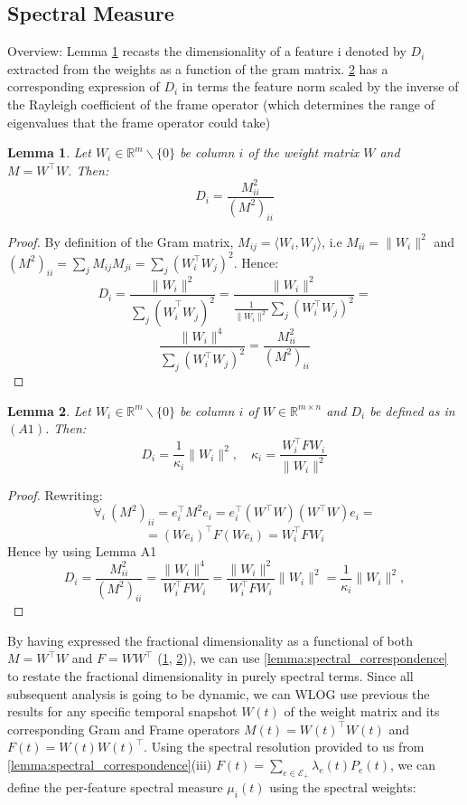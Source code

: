 \documentclass{article}
\theoremstyle{plain}
\newtheorem{lemma}{Lemma}[section]
\numberwithin{equation}{section}
\theoremstyle{definition}
\theoremstyle{remark}
\begin{document}
\subsection{Spectral Measure}
Overview: Lemma \ref{lemma:dimensionality_gram} recasts the dimensionality of a feature i denoted by $D_i$ extracted from the weights as a function of the gram matrix. \ref{lemma:dimensionality_kappa} has a corresponding expression of $D_i$ in terms the feature norm scaled by the inverse of the Rayleigh coefficient of the frame operator (which determines the range of eigenvalues that the frame operator could take) 
\begin{lemmaproofbox} 
\begin{lemma} \label{lemma:dimensionality_gram}
Let $W_i\in \mathbb{R}^m\backslash\{0\}$ be column $i$ of the weight matrix $W$ and $M = W^\top W$. 
Then: \begin{equation*}D_i = \frac{M_{ii}^2}{(M^2)_{ii}}\tag{A1}\end{equation*}
\end{lemma}
\begin{proof} By definition of the Gram matrix, $M_{ij} = \langle W_i, W_j\rangle$, i.e $M_{ii} = \|W_i\|^2$ and $(M^2)_{ii} = \sum_j M_{ij}M_{ji} = \sum_j (W_i^\top W_j)^2$. Hence: 
$$D_i = \frac{\|W_i\|^2}{\sum_j (\hat{W}_i^\top W_j)^2} =\frac{\|W_i\|^2}{\frac{1}{\|W_i\|^2}\sum_j (W_i^\top W_j)^2 }=$$
$$\frac{\|W_i\|^4}{\sum_j (W_i^\top W_j)^2 } = \frac{M_{ii}^2}{(M^2)_{ii}} $$
\end{proof}
\end{lemmaproofbox}

\begin{lemmaproofbox} 
    \begin{lemma} \label{lemma:dimensionality_kappa} Let $W_i\in \mathbb{R}^m\backslash \{0\}$ be column $i$ of $W\in \mathbb{R}^{m\times n}$ and $D_i$ be defined as in $(A1)$. Then:
        $$D_i = \frac{1}{\kappa_i} \|W_i\|^2, \quad \kappa_i = \frac{W_i^\top FW_i}{\|W_i\|^2}$$
    \end{lemma}
    \begin{proof} Rewriting:
        $$\forall_i \ (M^2)_{ii}= e_i^\top M^2 e_i = e_i^\top(W^\top W)(W^\top W)e_i =$$
$$=(We_i)^\top F(We_i) = W_i^\top F W_i$$
Hence by using Lemma A1 $$D_i = \frac{M_{ii}^2}{(M^2)_{ii}}= \frac{\|W_i\|^4}{W_i^\top FW_i} = \frac{\|W_i\|^2}{W_i^\top F W_i} \|W_i\|^2 = \frac{1}{\kappa_i}\|W_i\|^2,$$
    \end{proof}
\end{lemmaproofbox}
By having expressed the fractional dimensionality as a functional of both $M = W^\top W$ and $F = WW^\top$ (\ref{lemma:dimensionality_gram}, \ref{lemma:dimensionality_kappa})), we can use \ref{lemma:spectral_correspondence} to restate the fractional dimensionality in purely spectral terms. Since all subsequent analysis is going to be dynamic, we can WLOG use previous the results for any specific temporal snapshot $W(t)$ of the weight matrix and its corresponding Gram and Frame operators $M(t) = W(t)^\top W(t)$ and $F(t) = W(t)W(t)^\top$. Using the spectral resolution provided to us from \ref{lemma:spectral_correspondence}(iii) $F(t) = \sum_{e\in\mathcal{E}_+} \lambda_e(t) P_e(t)$, we can define the per-feature spectral measure $\mu_i(t)$ using the spectral weights:
\end{document}
